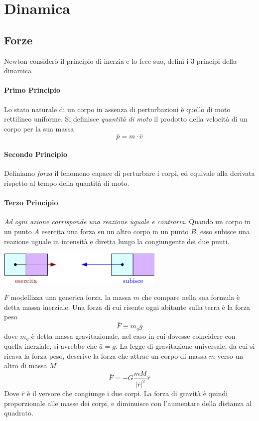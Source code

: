 \documentclass[10pt, letterpaper]{report}
\begin{document}
\chapter{Dinamica}
\section{Forze}
Newton considerò il principio di inerzia e lo fece suo, definì i 3 principi della dinamica
\subsubsection{Primo Principio}
Lo stato naturale di un corpo in assenza di perturbazioni è quello di moto rettilineo uniforme. \acc
{} Si definisce \textit{quantità di moto} il prodotto della velocità di un corpo per la sua massa 
$$ \bar p = m\cdot \bar v$$ 
\subsubsection{Secondo Principio}
Definiamo \textit{forza} il fenomeno capace di perturbare i corpi, ed equivale alla derivata rispetto al tempo 
della quantità di moto. 
\subsubsection{Terzo Principio}
\textit{Ad ogni azione corrisponde una reazione uguale e contraria}. Quando un corpo in un punto $A$ esercita una forza 
su un altro corpo in un punto $B$, esso subisce una reazione uguale in intensità e diretta lungo la 
congiungente dei due punti.\begin{center}
    \includegraphics[width=0.6\textwidth]{images/terzoPrincipio.eps}
\end{center}
$\bar F$ modellizza una generica forza, la massa $m$ che compare nella sua formula è detta 
massa inerziale. Una forza di cui risente ogni abitante sulla terra è la forza peso 
$$ \bar F \equiv m_g\bar g$$
dove $m_g$ è detta massa gravitazionale, nel caso in cui dovesse coincidere con quella 
inerziale, si avrebbe che $\bar a = \bar g$. La legge di gravitazione universale, da cui si ricava la 
forza peso, descrive la forza che attrae un corpo di massa $m$ verso un altro di massa $M$
$$ \bar F = -G\frac{mM}{|\bar r|^2}\hat r $$
Dove $\hat r$ è il versore che congiunge i due corpi. La forza di gravità è quindi proporzionale alle masse dei 
corpi, e diminuisce con l'aumentare della distanza al quadrato.
\end{document}
